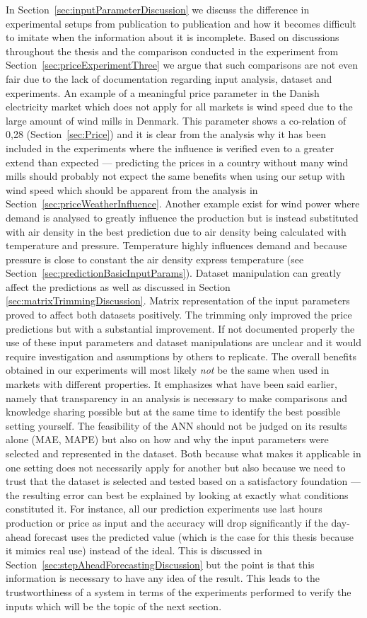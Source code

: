 In Section~\ref{sec:inputParameterDiscussion} we discuss the difference in experimental setups from publication to publication and how it becomes difficult to imitate when the information about it is incomplete. Based on discussions throughout the thesis and the comparison conducted in the experiment from Section~\ref{sec:priceExperimentThree} we argue that such comparisons are not even fair due to the lack of documentation regarding input analysis, dataset and experiments. An example of a meaningful price parameter in the Danish electricity market which does not apply for all markets is wind speed due to the large amount of wind mills in Denmark. This parameter shows a co-relation of 0,28 (Section~\ref{sec:Price}) and it is clear from the analysis why it has been included in the experiments where the influence is verified even to a greater extend than expected --- predicting the prices in a country without many wind mills should probably not expect the same benefits when using our setup with wind speed which should be apparent from the analysis in Section~\ref{sec:priceWeatherInfluence}. Another example exist for wind power where demand is analysed to greatly influence the production but is instead substituted with air density in the best prediction due to air density being calculated with temperature and pressure. Temperature highly influences demand and because pressure is close to constant the air density express temperature (see Section~\ref{sec:predictionBasicInputParams}). Dataset manipulation can greatly affect the predictions as well as discussed in Section \ref{sec:matrixTrimmingDiscussion}. Matrix representation of the input parameters proved to affect both datasets positively. The trimming only improved the price predictions but with a substantial improvement. If not documented properly the use of these input parameters and dataset manipulations are unclear and it would require investigation and assumptions by others to replicate. The overall benefits obtained in our experiments will most likely \emph{not} be the same when used in markets with different properties. It emphasizes what have been said earlier, namely that transparency in an analysis is necessary to make comparisons and knowledge sharing possible but at the same time to identify the best possible setting yourself. The feasibility of the ANN should not be judged on its results alone (MAE, MAPE) but also on how and why the input parameters were selected and represented in the dataset. Both because what makes it applicable in one setting does not necessarily apply for another but also because we need to trust that the dataset is selected and tested based on a satisfactory foundation --- the resulting error can best be explained by looking at exactly what conditions constituted it. For instance, all our prediction experiments use last hours production or price as input and the accuracy will drop significantly if the day-ahead forecast uses the predicted value (which is the case for this thesis because it mimics real use) instead of the ideal. This is discussed in Section~\ref{sec:stepAheadForecastingDiscussion} but the point is that this information is necessary to have any idea of the result. This leads to the trustworthiness of a system in terms of the experiments performed to verify the inputs which will be the topic of the next section.  
